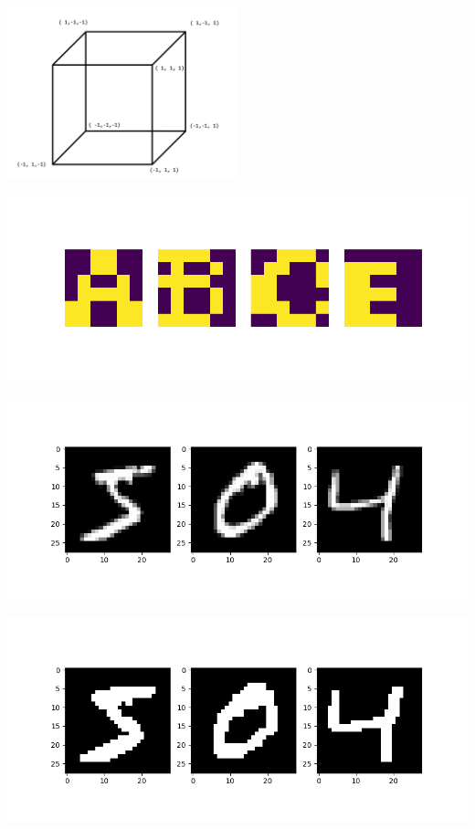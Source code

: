 \documentclass{article}
\begin{document}
	\begin{center}
	\end{center}
	
	\begin{center}
	\includegraphics[width=0.5\textwidth]{../img/hypercube.png}
	\end{center}		
	
	
	\begin{center}
	\includegraphics[scale=0.5]{../img/small_letters.png}	
	\end{center}
	\begin{center}
	\includegraphics[scale=0.5]{../img/digits.png}	
	\end{center}	

	\begin{center}
	\includegraphics[scale=0.5]{../img/digits_shifted.png}	
	\end{center}	
	
\end{document}
